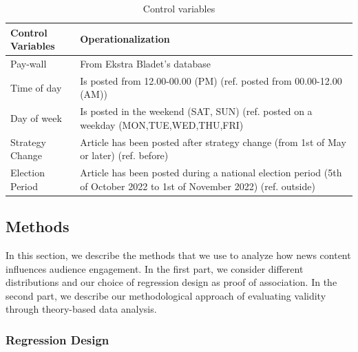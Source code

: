 \documentclass[
]{article}
\begin{document}
\begin{table}[H]

\caption{\label{tab:controls_opera}Control variables}
\centering
\begin{tabular}[t]{l>{\raggedright\arraybackslash}p{8cm}}
\toprule
Control Variables & Operationalization\\
\midrule
Pay-wall & From Ekstra Bladet’s database\\
Time of day & Is posted from 12.00-00.00 (PM) (ref. posted from 00.00-12.00 (AM))\\
Day of week & Is posted in the weekend (SAT, SUN) (ref. posted on a weekday (MON,TUE,WED,THU,FRI)\\
Strategy Change & Article has been posted after strategy change (from 1st of May or later) (ref. before)\\
Election Period & Article has been posted during a national election period (5th of October 2022 to 1st of November 2022) (ref. outside)\\
\bottomrule
\end{tabular}
\end{table}

\hypertarget{methods}{%
\subsection{Methods}\label{methods}}

In this section, we describe the methods that we use to analyze how news
content influences audience engagement. In the first part, we consider
different distributions and our choice of regression design as proof of
association. In the second part, we describe our methodological approach
of evaluating validity through theory-based data analysis.

\hypertarget{regression-design}{%
\subsubsection{Regression Design}\label{regression-design}}
\end{document}
